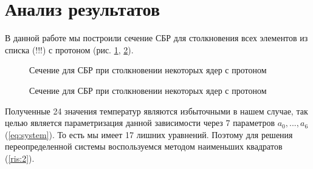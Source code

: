 \documentclass[%
master,    %
natbib,      %
subf,        %
href,        %
colorlinks,  %
]{disser}
\begin{document}
\section{Анализ результатов}
В данной работе мы построили сечение СБР для столкновения всех элементов из списка (!!!) с протоном (рис. \ref{ris:sigma-full}, \ref{ris:sigma-full-2}).

\begin{figure}
 	\caption{Сечение для СБР при столкновении некоторых ядер с протоном}
 	\label{ris:sigma-full}
\end{figure}
\begin{figure}
	\caption{Сечение для СБР при столкновении некоторых ядер с протоном}
	\label{ris:sigma-full-2}
\end{figure}
Полученные 24 значения температур являются избыточными в нашем случае, так целью является параметризация данной зависимости через 7 параметров $a_0, ..., a_6$ (\ref{eq:system}). То есть мы имеет 17 лишних уравнений. Поэтому для решения переопределенной системы воспользуемся методом наименьших квадратов (\ref{ris:2}).
\end{document}
